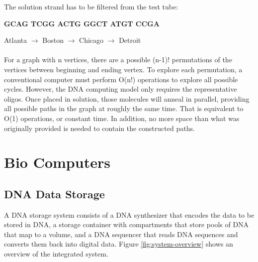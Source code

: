 The solution strand has to be filtered from the test tube:

\textbf{GCAG TCGG ACTG GGCT ATGT CCGA}

Atlanta $\rightarrow$ Boston $\rightarrow$ Chicago $\rightarrow$ Detroit
\\ \\
For a  graph  with  n  vertices,  there  are  a  possible  (n-1)! permutations of the vertices between beginning and ending vertex. To  explore  each  permutation,  a  conventional  computer  must  perform O(n!)  operations  to  explore  all  possible  cycles.  However,  the  DNA computing model only requires the representative oligos. Once placed in  solution,  those  molecules  will  anneal  in  parallel,  providing  all  possible paths  in  the  graph  at  roughly  the  same  time.  That  is  equivalent  to O(1)  operations,  or  constant  time.  In  addition,  no  more  space  than what  was  originally  provided  is  needed  to  contain  the  constructed paths.

\section{Bio Computers}
\subsection{DNA Data Storage}
A DNA storage system consists of a DNA synthesizer that encodes the data to be stored in DNA, a storage container
with compartments that store pools of DNA that map to a volume, and a DNA sequencer that reads DNA sequences
and converts them back into digital data. Figure \ref{fig:system-overview} shows an overview of the integrated system.

